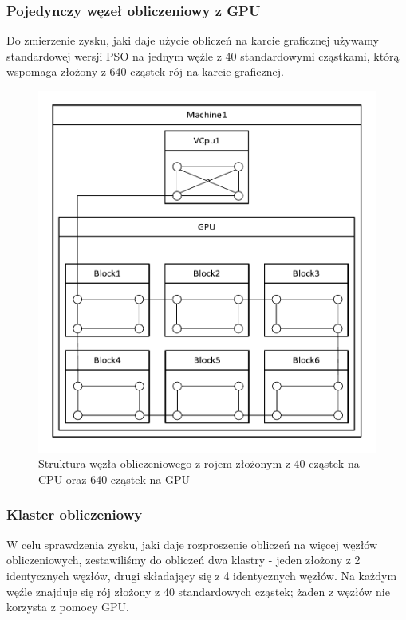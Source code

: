 \documentclass[12pt, twoside, openany, abstract=on]{report}
\theoremstyle{definition}
\begin{document}
\subsubsection{Pojedynczy węzeł obliczeniowy z GPU}
Do zmierzenie zysku, jaki daje użycie obliczeń na karcie graficznej używamy standardowej wersji PSO na jednym węźle z 40 standardowymi cząstkami, którą wspomaga złożony z 640 cząstek rój na karcie graficznej.

\begin{figure}[H]
    \centering
    \includegraphics[scale=1]{klasterBbobWithGPU.pdf} 
 \caption{Struktura węzła obliczeniowego z rojem złożonym z 40 cząstek na CPU oraz 640 cząstek na GPU}
\end{figure}

\subsubsection{Klaster obliczeniowy}
W celu sprawdzenia zysku, jaki daje rozproszenie obliczeń na więcej węzłów obliczeniowych, zestawiliśmy do obliczeń dwa klastry - jeden złożony z 2 identycznych węzłów, drugi składający się z 4 identycznych węzłów. Na każdym węźle znajduje się rój złożony z 40 standardowych cząstek; żaden z węzłów nie korzysta z pomocy GPU.
\end{document}
